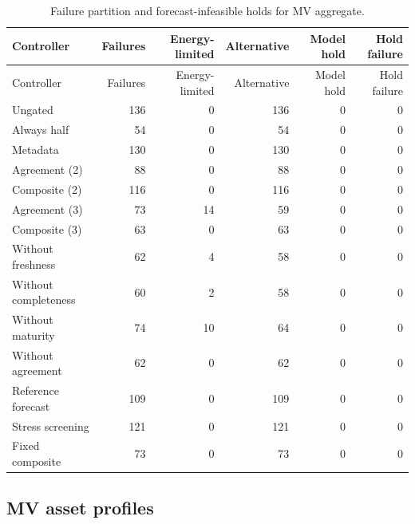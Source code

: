 \documentclass[11pt]{article}
\begin{document}
\small\begin{longtable}{lrrrrr}
\caption{Failure partition and forecast-infeasible holds for MV aggregate.}\\\toprule
Controller & Failures & Energy-limited & Alternative & Model hold & Hold failure\\\midrule
\endfirsthead
\toprule
Controller & Failures & Energy-limited & Alternative & Model hold & Hold failure\\\midrule
\endhead
\bottomrule\endfoot
Ungated & 136 & 0 & 136 & 0 & 0\\
Always half & 54 & 0 & 54 & 0 & 0\\
Metadata & 130 & 0 & 130 & 0 & 0\\
Agreement (2) & 88 & 0 & 88 & 0 & 0\\
Composite (2) & 116 & 0 & 116 & 0 & 0\\
Agreement (3) & 73 & 14 & 59 & 0 & 0\\
Composite (3) & 63 & 0 & 63 & 0 & 0\\
Without freshness & 62 & 4 & 58 & 0 & 0\\
Without completeness & 60 & 2 & 58 & 0 & 0\\
Without maturity & 74 & 10 & 64 & 0 & 0\\
Without agreement & 62 & 0 & 62 & 0 & 0\\
Reference forecast & 109 & 0 & 109 & 0 & 0\\
Stress screening & 121 & 0 & 121 & 0 & 0\\
Fixed composite & 73 & 0 & 73 & 0 & 0\\
\end{longtable}\normalsize
{}\subsection{MV asset profiles}
\end{document}
